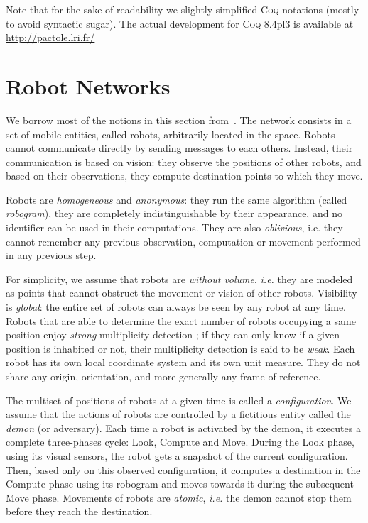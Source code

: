 \documentclass[11pt,a4]{llncs}
\newcommand{\x}{\xspace}
\newcommand{\coq}{\textsc{Coq}\x}
\begin{document}
Note that for the sake of readability we slightly simplified \coq
notations (mostly to avoid syntactic sugar). The actual development
for \coq 8.4pl3 is
available at \url{http://pactole.lri.fr/}

\section{Robot Networks}\label{sec:robots}

We borrow most of the notions in this section
from~\cite{suzuki99siam,agmon2006fault,FPS12b}.
The network consists in a set of  mobile entities, called robots, arbitrarily located 
in the space.
Robots cannot communicate directly by sending messages to each others.
Instead, their communication is based on vision:
they observe the positions of other robots, and based on their observations, 
they compute destination points to which they move.

Robots are \emph{homogeneous} and \emph{anonymous}: 
they run the same algorithm (called \emph{robogram}),
they are completely 
indistinguishable by their appearance, and no 
identifier can be used in their computations.
They are also \emph{oblivious}, {i.e.} they cannot remember any previous observation, computation or movement
performed in any previous step.

For simplicity, we assume that robots are \emph{without volume}, \emph{i.e.} 
they are modeled as points that cannot obstruct the movement or vision of other robots.
Visibility
is \emph{global}: the entire set of robots can always be seen by
any robot at any time.
Robots that are able to determine the exact number of robots occupying a same
position enjoy \emph{strong} multiplicity detection ; if they can
only know if a given position is inhabited or not, their multiplicity
detection is said to be \emph{weak}. 
Each robot has its own local coordinate system and its own unit measure. They do not share
any origin, orientation, and more generally any frame of reference.

The multiset of positions of robots at a given time is called a
\emph{configuration}.
We assume that the actions of robots are controlled by a fictitious entity called the \emph{demon} (or adversary).
Each time a robot is activated by the demon, it executes a complete three-phases cycle: 
Look, Compute and Move.
During the Look phase, using its visual sensors, the robot gets a snapshot of the current configuration. 
Then, based only on this observed configuration, it computes a destination in the Compute phase using its robogram
and moves towards it during the subsequent Move phase.
Movements of robots are \emph{atomic}, \emph{i.e.} the demon cannot stop them before they reach the destination.
\end{document}
